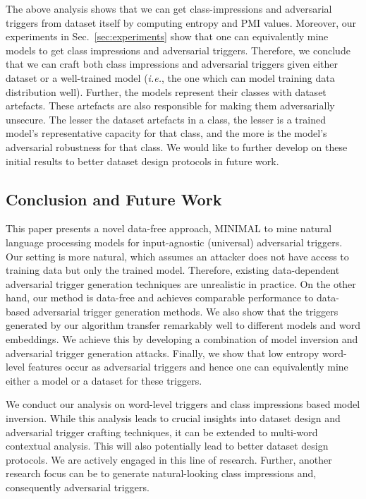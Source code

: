 The above analysis shows that we can get class-impressions and adversarial triggers from dataset itself by computing entropy and PMI values. Moreover, our experiments in Sec.~\ref{sec:experiments} show that one can equivalently mine models to get class impressions and adversarial triggers. Therefore,
we conclude that we can craft both class impressions and adversarial triggers given either dataset or a well-trained model (\textit{i.e.}, the one which can model training data distribution well). Further, the models represent their classes with dataset artefacts. These artefacts are also responsible for making them adversarially unsecure. The lesser the dataset artefacts in a class, the lesser is a trained model's representative capacity for that class, and the more is the model's adversarial robustness for that class. We would like to further develop on these initial results to better dataset design protocols in future work.





\subsection{Conclusion and Future Work}
\label{sec:conclusion}
This paper presents a novel data-free approach, MINIMAL to mine natural language processing models for input-agnostic (universal) adversarial triggers. Our setting is more natural, which assumes an attacker does not have access to training data but only the trained model. Therefore, existing data-dependent adversarial trigger generation techniques are unrealistic in practice. On the other hand, our method is data-free and achieves comparable performance to data-based adversarial trigger generation methods. We also show that the triggers generated by our algorithm transfer remarkably well to different models and word embeddings. We achieve this by developing a combination of model inversion and adversarial trigger generation attacks. Finally, we show that low entropy word-level features occur as adversarial triggers and hence one can equivalently mine either a model or a dataset for these triggers.


We conduct our analysis on word-level triggers and class impressions based model inversion. While this analysis leads to crucial insights into dataset design and adversarial trigger crafting techniques, it can be extended to multi-word contextual analysis. %
This will also potentially lead to better dataset design protocols. We are actively engaged in this line of research. Further, another research focus can be to generate natural-looking class impressions and, consequently adversarial triggers.







